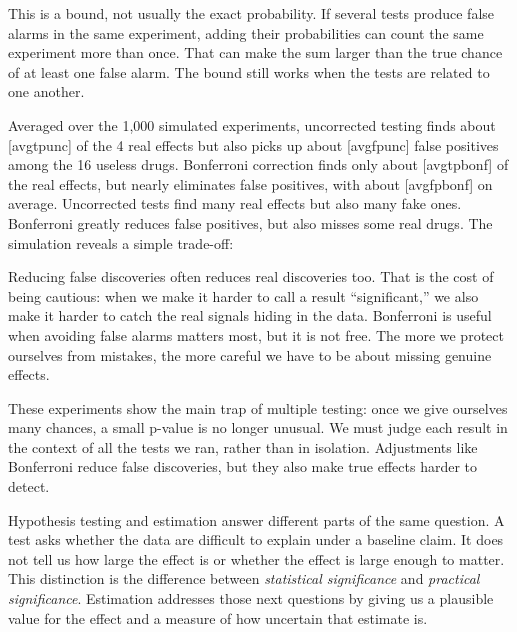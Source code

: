 This is a bound, not usually the exact probability. If several tests
produce false alarms in the same experiment, adding their probabilities
can count the same experiment more than once. That can make the sum
larger than the true chance of at least one false alarm. The bound still
works when the tests are related to one another.


Averaged over the 1,000 simulated experiments, uncorrected testing
finds about
[avgtpunc] of the 4 real
effects but also picks up about
[avgfpunc] false positives
among the 16 useless drugs. Bonferroni correction finds only about
[avgtpbonf] of the real
effects, but nearly eliminates false positives, with about
[avgfpbonf] on average.
Uncorrected tests find many real effects but also many fake ones.
Bonferroni greatly reduces false positives, but also misses some real
drugs. The simulation reveals a simple trade-off:

Reducing false discoveries often reduces real discoveries too.
That is the cost of being cautious: when we make it harder to call a
result ``significant,'' we also make it harder to catch the real
signals hiding in the data. Bonferroni is useful when avoiding false
alarms matters most, but it is not free. The more we protect ourselves
from mistakes, the more careful we have to be about missing genuine
effects.



These experiments show the main trap of multiple testing: once we give
ourselves many chances, a small p-value is no longer unusual. We must
judge each result in the context of all the tests we ran, rather than
in isolation. Adjustments like Bonferroni reduce false discoveries, but
they also make true effects harder to detect.

Hypothesis testing and estimation answer different parts of the same
question. A test asks whether the data are difficult to explain under a
baseline claim. It does not tell us how large the effect is or whether
the effect is large enough to matter. This distinction is the difference
between \emph{statistical significance}
and \emph{practical significance}.
Estimation addresses those next questions by giving us a plausible
value for the effect and a measure of how uncertain that estimate is.

